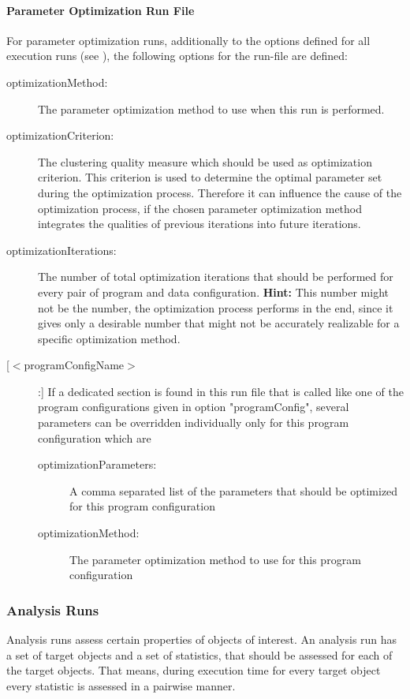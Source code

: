 		\paragraph{Parameter Optimization Run File}\label{paramOpt_run_files}
		
		For parameter optimization runs, additionally to the options defined for all execution runs (see ), the following options for the run-file are defined:
		 \begin{description}
		 	\item[optimizationMethod:] The parameter optimization method to use when this run is performed.
		 	\item[optimizationCriterion:] The clustering quality measure which should be used as optimization criterion. This criterion is used to determine the optimal parameter set during the optimization process. Therefore it can influence the cause of the optimization process, if the chosen parameter optimization method integrates the qualities of previous iterations into future iterations.
		 	\item[optimizationIterations:] The number of total optimization iterations that should be performed for every pair of program and data configuration. \textbf{Hint:} This number might not be the number, the optimization process performs in the end, since it gives only a desirable number that might not be accurately realizable for a specific optimization method.
			\item[[$<$programConfigName$>$]:]
			If a dedicated section is found in this run file that is called like one of the program configurations given in option "programConfig", several parameters can be overridden individually only for this program configuration which are
			\begin{description}			 	
				\item[optimizationParameters:] A comma separated list of the parameters that should be optimized for this program configuration
				\item[optimizationMethod:] The parameter optimization method to use for this program configuration
\end{description}
		 \end{description}
		
		
		\subsubsection{Analysis Runs} \label{analysis_runs}		
			Analysis runs assess certain properties of objects of interest. An analysis run has a set of target objects and a set of statistics, that should be assessed for each of the target objects. That means, during execution time for every target object every statistic is assessed in a pairwise manner.
		
